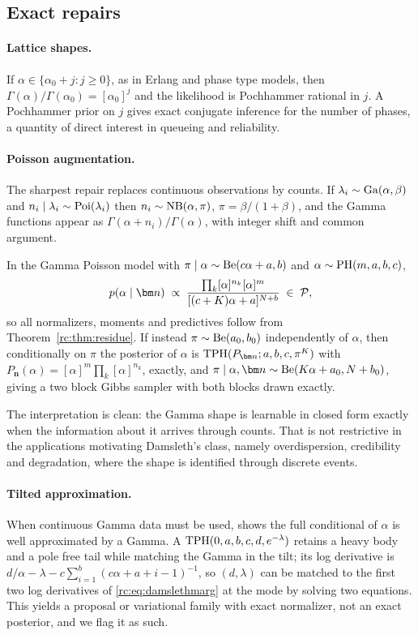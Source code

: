 \subsection{Exact repairs}

\paragraph{Lattice shapes.} If $\alpha\in\{\alpha_0+j:j\ge0\}$, as in Erlang and phase type models, then $\Gamma(\alpha)/\Gamma(\alpha_0)=[\alpha_0]^j$ and the likelihood is Pochhammer rational in $j$. A Pochhammer prior on $j$ gives exact conjugate inference for the number of phases, a quantity of direct interest in queueing and reliability.

\paragraph{Poisson augmentation.} The sharpest repair replaces continuous observations by counts. If $\lambda_i\sim\mathrm{Ga}(\alpha,\beta)$ and $n_i\mid\lambda_i\sim\mathrm{Poi}(\lambda_i)$ then $n_i\sim\mathrm{NB}(\alpha,\pi)$, $\pi=\beta/(1+\beta)$, and the Gamma functions appear as $\Gamma(\alpha+n_i)/\Gamma(\alpha)$, with integer shift and common argument.

\begin{proposition}\label{rc:prop:gammashape}
In the Gamma Poisson model with $\pi\mid\alpha\sim\mathrm{Be}(c\alpha+a,b)$ and $\alpha\sim\mathrm{PH}(m,a,b,c)$,
\[
p(\alpha\mid\bm n)\;\propto\;\frac{\prod_k[\alpha]^{n_k}[\alpha]^m}{[(c+K)\alpha+a]^{N+b}}\;\in\;\rcP,
\]
so all normalizers, moments and predictives follow from Theorem~\ref{rc:thm:residue}. If instead $\pi\sim\mathrm{Be}(a_0,b_0)$ independently of $\alpha$, then conditionally on $\pi$ the posterior of $\alpha$ is $\rcTPH(P_{\bm n};a,b,c,\pi^K)$ with $P_{\bm n}(\alpha)=[\alpha]^m\prod_k[\alpha]^{n_k}$, exactly, and $\pi\mid\alpha,\bm n\sim\rcBe(K\alpha+a_0,N+b_0)$, giving a two block Gibbs sampler with both blocks drawn exactly.
\end{proposition}

The interpretation is clean: the Gamma shape is learnable in closed form exactly when the information about it arrives through counts. That is not restrictive in the applications motivating Damsleth's class, namely overdispersion, credibility and degradation, where the shape is identified through discrete events.

\paragraph{Tilted approximation.} When continuous Gamma data must be used, \citet{rc:miller2019} shows the full conditional of $\alpha$ is well approximated by a Gamma. A $\mathrm{TPH}(0,a,b,c,d,e^{-\lambda})$ retains a heavy body and a pole free tail while matching the Gamma in the tilt; its log derivative is $d/\alpha-\lambda-c\sum_{i=1}^b(c\alpha+a+i-1)^{-1}$, so $(d,\lambda)$ can be matched to the first two log derivatives of \eqref{rc:eq:damslethmarg} at the mode by solving two equations. This yields a proposal or variational family with exact normalizer, not an exact posterior, and we flag it as such.

